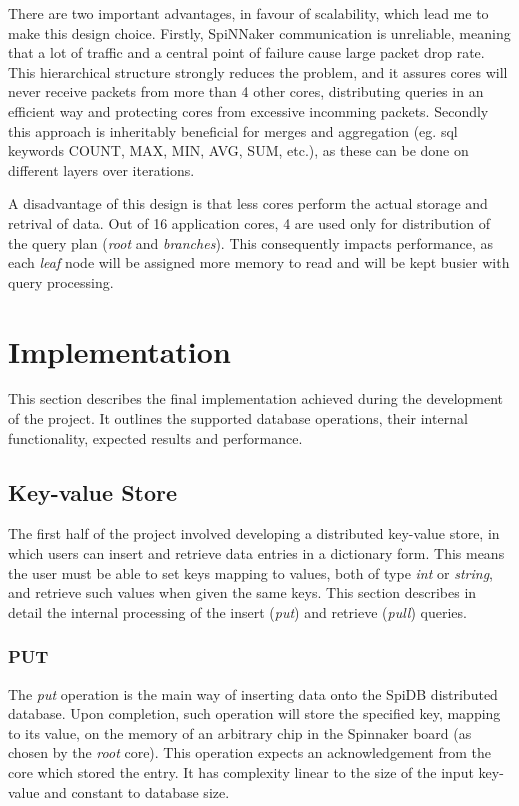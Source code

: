 There are two important advantages, in favour of scalability, which lead me to make this design choice. Firstly, SpiNNaker communication is unreliable, meaning that a lot of traffic and a central point of failure cause large packet drop rate. This hierarchical structure strongly reduces the problem, and it assures cores will never receive packets from more than 4 other cores, distributing queries in an efficient way and protecting cores from excessive incomming packets. Secondly this approach is inheritably beneficial for merges and aggregation (eg. sql keywords COUNT, MAX, MIN, AVG, SUM, etc.), as these can be done on different layers over iterations. 

A disadvantage of this design is that less cores perform the actual storage and retrival of data. Out of 16 application cores, 4 are used only for distribution of the query plan (\textit{root} and \textit{branches}). This consequently impacts performance, as each \textit{leaf} node will be assigned more memory to read and will be kept busier with query processing.

\section{Implementation}
\label{sec:implementation}
This section describes the final implementation achieved during the development of the project. It outlines the supported database operations, their internal functionality, expected results and performance.

\subsection{Key-value Store}
The first half of the project involved developing a distributed key-value store, in which users can insert and retrieve data entries in a dictionary form. This means the user must be able to set keys mapping to values, both of type \textit{int} or \textit{string}, and retrieve such values when given the same keys. This section describes in detail the internal processing of the insert (\textit{put}) and retrieve (\textit{pull}) queries. 

\subsubsection{PUT}
The \textit{put} operation is the main way of inserting data onto the SpiDB distributed database. 
Upon completion, such operation will store the specified key, mapping to its value, on the memory of an arbitrary chip in the Spinnaker board (as chosen by the \textit{root} core). This operation expects an acknowledgement from the core which stored the entry. It has complexity linear to the size of the input key-value and constant to database size.

